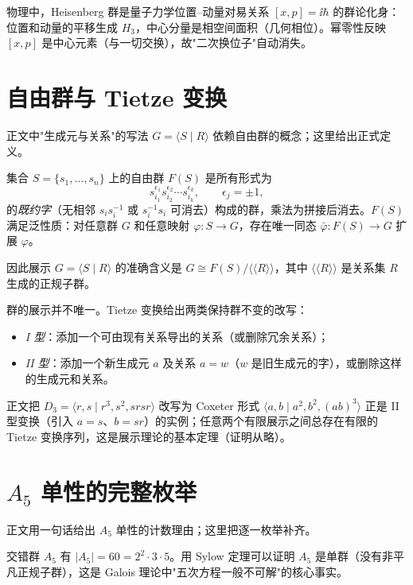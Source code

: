 物理中，Heisenberg 群是量子力学位置--动量对易关系 $[x,p]=\ii\hbar$ 的群论化身：位置和动量的平移生成 $H_3$，中心分量是相空间面积（几何相位）。幂零性反映 $[x,p]$ 是中心元素（与一切交换），故"二次换位子"自动消失。
\par\medskip

\section{自由群与 Tietze 变换}
\label{sec:free-group-tietze}

正文中"生成元与关系"的写法 $G=\langle S\mid R\rangle$ 依赖自由群的概念；这里给出正式定义。

\begin{definition}[自由群]
集合 $S=\{s_1,\dots,s_n\}$ 上的自由群 $F(S)$ 是所有形式为
\[
s_{i_1}^{\epsilon_1}s_{i_2}^{\epsilon_2}\cdots s_{i_k}^{\epsilon_k},
\qquad\epsilon_j=\pm1,
\]
的\emph{既约字}（无相邻 $s_i s_i^{-1}$ 或 $s_i^{-1}s_i$ 可消去）构成的群，乘法为拼接后消去。$F(S)$ 满足泛性质：对任意群 $G$ 和任意映射 $\varphi:S\to G$，存在唯一同态 $\bar\varphi:F(S)\to G$ 扩展 $\varphi$。
\end{definition}

因此展示 $G=\langle S\mid R\rangle$ 的准确含义是 $G\cong F(S)/\langle\!\langle R\rangle\!\rangle$，其中 $\langle\!\langle R\rangle\!\rangle$ 是关系集 $R$ 生成的正规子群。

群的展示并不唯一。Tietze 变换给出两类保持群不变的改写：
\begin{itemize}
\item \emph{I 型}：添加一个可由现有关系导出的关系（或删除冗余关系）；
\item \emph{II 型}：添加一个新生成元 $a$ 及关系 $a=w$（$w$ 是旧生成元的字），或删除这样的生成元和关系。
\end{itemize}
正文把 $D_3=\langle r,s\mid r^3,s^2,srsr\rangle$ 改写为 Coxeter 形式 $\langle a,b\mid a^2,b^2,(ab)^3\rangle$ 正是 II 型变换（引入 $a=s$、$b=sr$）的实例；任意两个有限展示之间总存在有限的 Tietze 变换序列，这是展示理论的基本定理（证明从略）。

\section{\texorpdfstring{$A_5$}{A5} 单性的完整枚举}
\label{sec:a5-enumeration}

正文用一句话给出 $A_5$ 单性的计数理由；这里把逐一枚举补齐。
\label{ex:a5-simplicity}

交错群 $A_5$ 有 $|A_5|=60=2^2\cdot3\cdot5$。用 Sylow 定理可以证明 $A_5$ 是单群（没有非平凡正规子群），这是 Galois 理论中"五次方程一般不可解"的核心事实。

